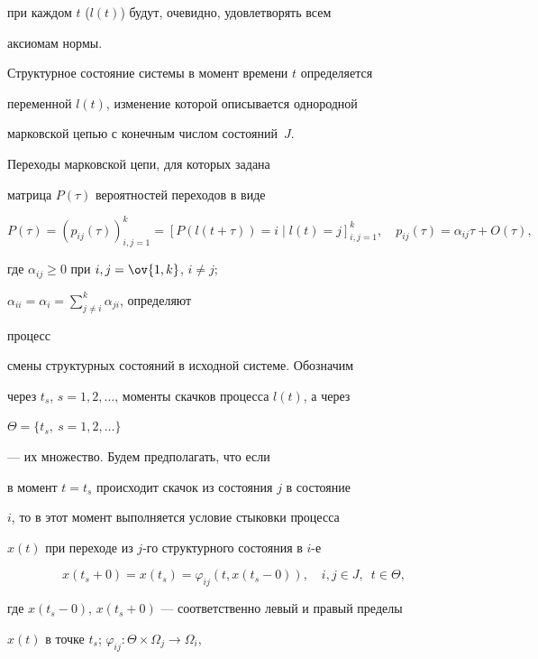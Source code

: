 при каждом $t$ ($l(t)$) будут, очевидно, удовлетворять всем  


аксиомам нормы. 


 


Структурное состояние системы в момент времени $t$ определяется 


переменной $l(t)$, изменение которой описывается однородной 


марковской цепью с конечным числом состояний~$J$. 


Переходы марковской цепи, для которых задана  


матрица $P(\tau)$ вероятностей переходов в виде 


\begin{equation} 


P(\tau)=(p_{ij}(\tau))^k_{i,j=1}= 


[P(l(t+\tau))=i\mid l(t)=j]^k_{i,j=1},\quad 


p_{ij}(\tau)=\alpha_{ij}\tau+O(\tau), 


\end{equation} 


где $\alpha_{ij}\ge0$ при $i,j=\ov{1,k}$, $i\ne j$; 


$\alpha_{ii}=\alpha_i=\sum\limits^k_{j\ne i}\alpha_{ji}$, определяют 


процесс 


смены структурных состояний в исходной системе. Обозначим  


через $t_s$, $s=1,2,\dotsc$, моменты скачков процесса $l(t)$, а через  


$\Theta=\{t_s,\ s=1,2,\dotsc\}$ 


--- их множество. Будем предполагать, что если  


в момент $t=t_s$ происходит скачок из состояния $j$ в состояние 


$i$, то в этот момент выполняется условие стыковки процесса  


$x(t)$ при переходе из $j$-го структурного состояния в $i$-е 


\begin{equation} 


x(t_s+0)=x(t_s)=\varphi_{ij}(t,x(t_s-0)),\quad 


i,j\in J,\ \; t\in\Theta, 


\end{equation} 


где $x(t_s-0)$, $x(t_s+0)$ --- соответственно левый и правый пределы 


$x(t)$ в точке $t_s$; $\varphi_{ij}:\Theta\times\Omega_j\to\Omega_i$, 


